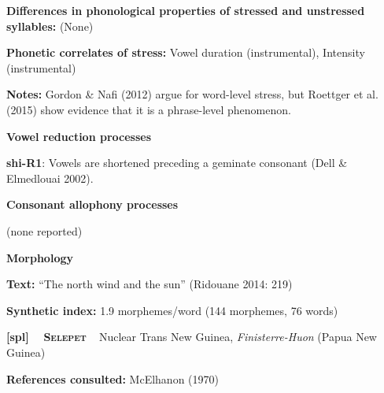 \begin{styleBody}
\textbf{Differences in phonological properties of stressed and unstressed syllables:} (None)
\end{styleBody}

\begin{styleBody}
\textbf{Phonetic correlates of stress: }Vowel duration (instrumental), Intensity (instrumental)
\end{styleBody}

\begin{styleBody}
\textbf{Notes: }Gordon \& Nafi (2012) argue for word-level stress, but Roettger et al. (2015) show evidence that it is a phrase-level phenomenon.
\end{styleBody}

\begin{styleBody}
\textbf{Vowel reduction processes}
\end{styleBody}

\begin{styleBody}
\textbf{shi-R1}: Vowels are shortened preceding a geminate consonant (Dell \& Elmedlouai 2002).
\end{styleBody}

\begin{styleBody}
\textbf{Consonant allophony processes}
\end{styleBody}

\begin{styleBody}
(none reported)
\end{styleBody}

\begin{styleBody}
\textbf{Morphology}
\end{styleBody}

\begin{styleBody}
\textbf{Text:} “The north wind and the sun” (Ridouane 2014: 219)
\end{styleBody}

\begin{styleBody}
\textbf{Synthetic index: }1.9 morphemes/word (144 morphemes, 76 words)
\end{styleBody}

\clearpage\begin{styleBody}
\textbf{[spl] }\ \ \textbf{\textsc{Selepet}}\textbf{\ \ }Nuclear Trans New Guinea, \textit{Finisterre-Huon} (Papua New Guinea)
\end{styleBody}

\begin{styleBody}
\textbf{References consulted: }McElhanon (1970)
\end{styleBody}

